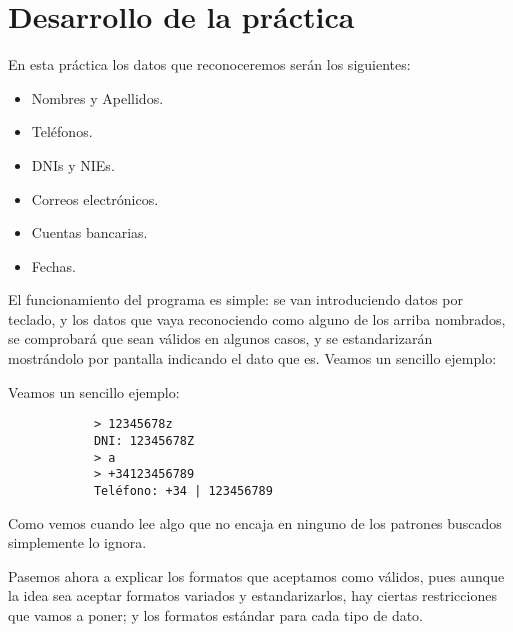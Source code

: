 \documentclass[12pt]{article}
\begin{document}
    \section{Desarrollo de la práctica}
    En esta práctica los datos que reconoceremos serán los siguientes:
    \begin{itemize}
        \item Nombres y Apellidos.
        \item Teléfonos.
        \item DNIs y NIEs.
        \item Correos electrónicos.
        \item Cuentas bancarias.
        \item Fechas.
    \end{itemize}

    El funcionamiento del programa es simple: se van introduciendo datos por teclado, y los datos que vaya reconociendo como alguno de los arriba nombrados, se comprobará que sean válidos en algunos casos, y se estandarizarán mostrándolo por pantalla indicando el dato que es. Veamos un sencillo ejemplo: 
    \begin{ejemplo}
        Veamos un sencillo ejemplo:
        \begin{verbatim}
            > 12345678z
            DNI: 12345678Z
            > a
            > +34123456789
            Teléfono: +34 | 123456789
        \end{verbatim}
        Como vemos cuando lee algo que no encaja en ninguno de los patrones buscados simplemente lo ignora. 
    \end{ejemplo}

    Pasemos ahora a explicar los formatos que aceptamos como válidos, pues aunque la idea sea aceptar formatos variados y estandarizarlos, hay ciertas restricciones que vamos a poner; y los formatos estándar para cada tipo de dato.
\end{document}
